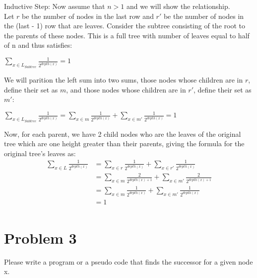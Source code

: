 \documentclass[12pt]{article}
\begin{document}
Inductive Step:
Now assume that $n>1$ and we will show the relationship. \\
Let $r$ be the number of nodes in the last row and $r'$ be the number of nodes in the (last - 1) row that are leaves.  Consider the subtree consisting of the root to the parents of these nodes.
This is a full tree with number of leaves equal to half of n and thus satisfies:\\
\centerline{$ \sum\limits_{x \in L_{Subtree}} \frac{1}{2^{depth(x)}}= 1 $}
We will parition the left sum into two sums, those nodes whose children are in $r$, define their set as $m$, and those nodes whose children are in $r'$, define their set as $m'$:\\
\centerline{$ \sum\limits_{x \in L_{Subtree}} \frac{1}{2^{depth(x)}}=  \sum\limits_{x \in m} \frac{1}{2^{depth(x)}} +  \sum\limits_{x \in m'} \frac{1}{2^{depth(x)}}  = 1 $}

Now, for each parent, we have 2 child nodes who are the leaves of the original tree which are one height greater than their parents, giving the formula for the original tree's leaves as:\\
\begin{align*}
\sum\limits_{x \in L} \frac{1}{2^{depth(x)}}  & =  \sum\limits_{x \in r} \frac{1}{2^{depth(x)}} +  \sum\limits_{x \in r'} \frac{1}{2^{depth(x)}} \\
                                                                         & = \sum\limits_{x \in m} \frac{2}{2^{depth(x)+1}} +  \sum\limits_{x \in m'} \frac{2}{2^{depth(x)+1}} \\
                                                                         & =   \sum\limits_{x \in m} \frac{1}{2^{depth(x)}} +  \sum\limits_{x \in m'} \frac{1}{2^{depth(x)}} \\
                                                                         & = 1\\
\end{align*}


\section{Problem 3}
 Please write a program or a pseudo code that finds the successor for a given node x. 
\end{document}
